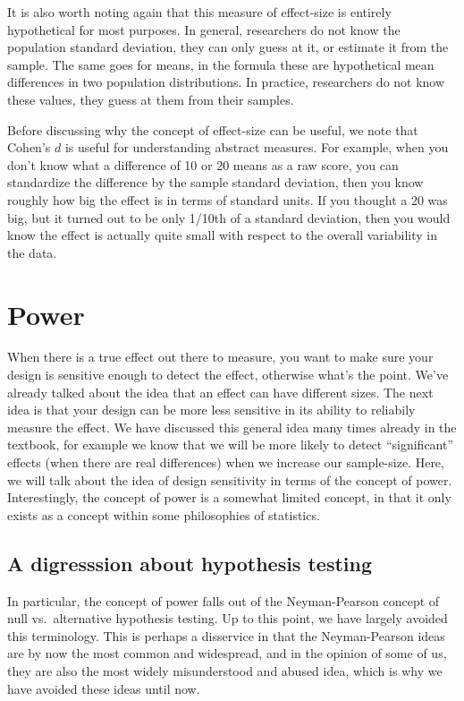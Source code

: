 \documentclass[
]{book}
\begin{document}
It is also worth noting again that this measure of effect-size is entirely hypothetical for most purposes. In general, researchers do not know the population standard deviation, they can only guess at it, or estimate it from the sample. The same goes for means, in the formula these are hypothetical mean differences in two population distributions. In practice, researchers do not know these values, they guess at them from their samples.

Before discussing why the concept of effect-size can be useful, we note that Cohen's \(d\) is useful for understanding abstract measures. For example, when you don't know what a difference of 10 or 20 means as a raw score, you can standardize the difference by the sample standard deviation, then you know roughly how big the effect is in terms of standard units. If you thought a 20 was big, but it turned out to be only 1/10th of a standard deviation, then you would know the effect is actually quite small with respect to the overall variability in the data.

\section{Power}\label{power}

When there is a true effect out there to measure, you want to make sure your design is sensitive enough to detect the effect, otherwise what's the point. We've already talked about the idea that an effect can have different sizes. The next idea is that your design can be more less sensitive in its ability to reliabily measure the effect. We have discussed this general idea many times already in the textbook, for example we know that we will be more likely to detect ``significant'' effects (when there are real differences) when we increase our sample-size. Here, we will talk about the idea of design sensitivity in terms of the concept of power. Interestingly, the concept of power is a somewhat limited concept, in that it only exists as a concept within some philosophies of statistics.

\subsection{A digresssion about hypothesis testing}\label{a-digresssion-about-hypothesis-testing}

In particular, the concept of power falls out of the Neyman-Pearson concept of null vs.~alternative hypothesis testing. Up to this point, we have largely avoided this terminology. This is perhaps a disservice in that the Neyman-Pearson ideas are by now the most common and widespread, and in the opinion of some of us, they are also the most widely misunderstood and abused idea, which is why we have avoided these ideas until now.
\end{document}
